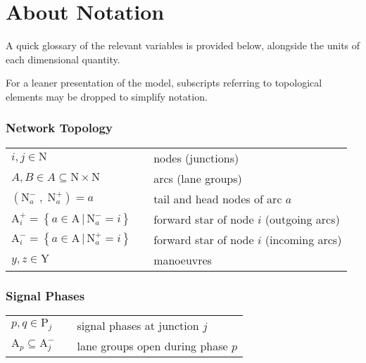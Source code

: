 \section*{About Notation}
A quick glossary of the relevant variables is provided below, alongside the units of each dimensional quantity.

For a leaner presentation of the model, subscripts referring to
topological elements may be dropped to simplify notation.

\subsubsection*{Network Topology}
\begin{tabu} to \textwidth {X[3,c] X[1,c] X[6,l]}
$i,j \in \mathrm{N}$ & & nodes (junctions) \\[2pt]

$A,B \in A \subseteq \mathrm{N} \times \mathrm{N} $ & & arcs (lane groups) \\[2pt]

$\left( \mathrm{N}_{a}^{-} \; , \;\mathrm{N}_{a}^{+} \right) = a$ & & tail and head nodes of arc $a$ \\[2pt]

$\mathrm{A}_{i}^{+} = \left\lbrace a \in \mathrm{A} \, | \, \mathrm{N}_{a}^{-} = i \right\rbrace $ & & forward star of node $i$ (outgoing arcs)\\[2pt]

$\mathrm{A}_{i}^{-} = \left\lbrace a \in \mathrm{A} \, | \, \mathrm{N}_{a}^{+} = i \right\rbrace $ & & forward star of node $i$ (incoming arcs)\\[2pt]

$y,z \in \mathrm{Y}$ & & manoeuvres\\

\end{tabu} 


\subsubsection*{Signal Phases}
\begin{tabu} to \textwidth {X[3,c] X[1,c] X[6,l]}
$p,q \in \mathrm{P}_{j}$ & & signal phases at junction $j$\\[2pt]

$\mathrm{A}_{p} \subseteq \mathrm{A}_{j}^{-} $ & & lane groups open during phase $p$ \\[2pt]

\end{tabu} 


